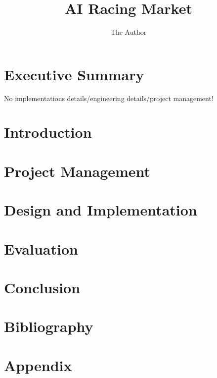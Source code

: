\documentclass[11pt, oneside]{report}
\title{AI Racing Market}
\author{The Author}
\begin{document}
\maketitle


\tableofcontents

\chapter{Executive Summary}
No implementations details/engineering details/project management!

\chapter{Introduction}


\chapter{Project Management}


\chapter{Design and Implementation}


\chapter{Evaluation}


\chapter{Conclusion}


\chapter{Bibliography}


\appendix
\chapter{Appendix}

\end{document}

